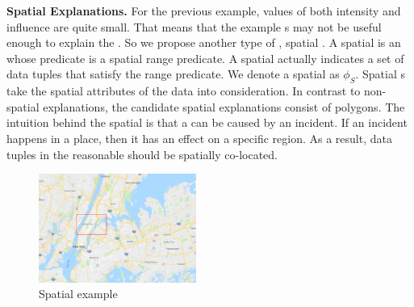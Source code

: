 {\bf Spatial Explanations.}
For the previous example, values of both intensity and influence are quite small. 
That means that the example {\explanation}s may not be useful enough to explain the {\fact}. 
So we propose another type of {\explanation}, spatial {\explanation}. 
A spatial {\explanation} is an {\explanation} whose predicate is a spatial range predicate. A spatial {\explanation} actually indicates a set of data tuples that satisfy the range predicate. We denote a spatial {\explanation} as $\phi_S$. 
Spatial {\explanation}s take the spatial attributes of the data into consideration. In contrast to non-spatial explanations, the candidate spatial explanations consist of polygons. 
The intuition behind the spatial {\explanation} is that a {\fact} can be caused by an incident. If an incident happens in a place, then it has an effect on a specific region. 
As a result, data tuples in the reasonable {\explanation} should be spatially co-located. 



\begin{figure}[t]
	\centering
	\includegraphics[width=0.46\textwidth]{images/spatial_explanation_map.eps}
	\caption{Spatial {\explanation} example}
	\label{fig:spatial_explanation_example}
\end{figure}

